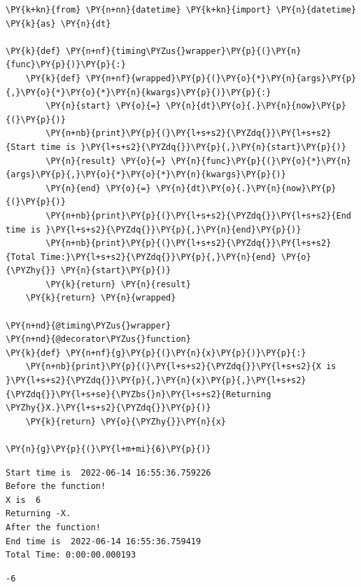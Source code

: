    \begin{tcolorbox}[breakable, size=fbox, boxrule=1pt, pad at break*=1mm,colback=cellbackground, colframe=cellborder]
\begin{Verbatim}[commandchars=\\\{\}]
\PY{k+kn}{from} \PY{n+nn}{datetime} \PY{k+kn}{import} \PY{n}{datetime} \PY{k}{as} \PY{n}{dt}

\PY{k}{def} \PY{n+nf}{timing\PYZus{}wrapper}\PY{p}{(}\PY{n}{func}\PY{p}{)}\PY{p}{:}
    \PY{k}{def} \PY{n+nf}{wrapped}\PY{p}{(}\PY{o}{*}\PY{n}{args}\PY{p}{,}\PY{o}{*}\PY{o}{*}\PY{n}{kwargs}\PY{p}{)}\PY{p}{:}
        \PY{n}{start} \PY{o}{=} \PY{n}{dt}\PY{o}{.}\PY{n}{now}\PY{p}{(}\PY{p}{)}
        \PY{n+nb}{print}\PY{p}{(}\PY{l+s+s2}{\PYZdq{}}\PY{l+s+s2}{Start time is }\PY{l+s+s2}{\PYZdq{}}\PY{p}{,}\PY{n}{start}\PY{p}{)}
        \PY{n}{result} \PY{o}{=} \PY{n}{func}\PY{p}{(}\PY{o}{*}\PY{n}{args}\PY{p}{,}\PY{o}{*}\PY{o}{*}\PY{n}{kwargs}\PY{p}{)}
        \PY{n}{end} \PY{o}{=} \PY{n}{dt}\PY{o}{.}\PY{n}{now}\PY{p}{(}\PY{p}{)}
        \PY{n+nb}{print}\PY{p}{(}\PY{l+s+s2}{\PYZdq{}}\PY{l+s+s2}{End time is }\PY{l+s+s2}{\PYZdq{}}\PY{p}{,}\PY{n}{end}\PY{p}{)}
        \PY{n+nb}{print}\PY{p}{(}\PY{l+s+s2}{\PYZdq{}}\PY{l+s+s2}{Total Time:}\PY{l+s+s2}{\PYZdq{}}\PY{p}{,}\PY{n}{end} \PY{o}{\PYZhy{}} \PY{n}{start}\PY{p}{)}
        \PY{k}{return} \PY{n}{result}
    \PY{k}{return} \PY{n}{wrapped}

\PY{n+nd}{@timing\PYZus{}wrapper}
\PY{n+nd}{@decorator\PYZus{}function}
\PY{k}{def} \PY{n+nf}{g}\PY{p}{(}\PY{n}{x}\PY{p}{)}\PY{p}{:}
    \PY{n+nb}{print}\PY{p}{(}\PY{l+s+s2}{\PYZdq{}}\PY{l+s+s2}{X is }\PY{l+s+s2}{\PYZdq{}}\PY{p}{,}\PY{n}{x}\PY{p}{,}\PY{l+s+s2}{\PYZdq{}}\PY{l+s+se}{\PYZbs{}n}\PY{l+s+s2}{Returning \PYZhy{}X.}\PY{l+s+s2}{\PYZdq{}}\PY{p}{)}
    \PY{k}{return} \PY{o}{\PYZhy{}}\PY{n}{x}

\PY{n}{g}\PY{p}{(}\PY{l+m+mi}{6}\PY{p}{)}
\end{Verbatim}
\end{tcolorbox}

    \begin{Verbatim}[commandchars=\\\{\}]
Start time is  2022-06-14 16:55:36.759226
Before the function!
X is  6
Returning -X.
After the function!
End time is  2022-06-14 16:55:36.759419
Total Time: 0:00:00.000193
    \end{Verbatim}

            \begin{tcolorbox}[breakable, size=fbox, boxrule=.5pt, pad at break*=1mm, opacityfill=0]
\begin{Verbatim}[commandchars=\\\{\}]
-6
\end{Verbatim}
\end{tcolorbox}
        
